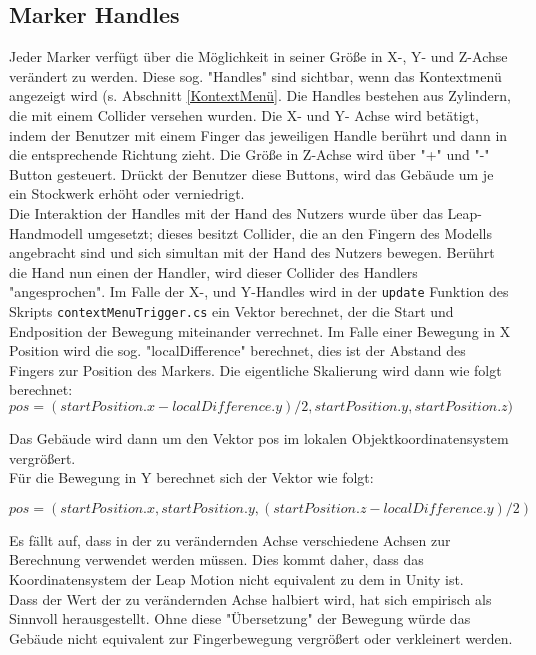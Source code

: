 \subsection{Marker Handles}\label{sec:markerHandles}
Jeder Marker verfügt über die Möglichkeit in seiner Größe in X-, Y- und Z-Achse verändert zu werden. Diese sog. "Handles" sind sichtbar, wenn das Kontextmenü angezeigt wird (s. Abschnitt  \ref{KontextMenü}. Die Handles bestehen aus Zylindern, die mit einem Collider versehen wurden. Die X- und Y- Achse wird betätigt, indem der Benutzer mit einem Finger das jeweiligen Handle berührt und dann in die entsprechende Richtung zieht. Die Größe in Z-Achse wird über "+" und "-" Button gesteuert. Drückt der Benutzer diese Buttons, wird das Gebäude um je ein Stockwerk erhöht oder verniedrigt. \\
Die Interaktion der Handles mit der Hand des Nutzers wurde über das Leap-Handmodell umgesetzt; dieses besitzt Collider, die an den Fingern des Modells angebracht sind und sich simultan mit der Hand des Nutzers bewegen. Berührt die Hand nun einen der Handler, wird dieser Collider des Handlers "angesprochen". Im Falle der X-, und Y-Handles wird in der \texttt{update} Funktion des Skripts \texttt{contextMenuTrigger.cs} ein Vektor berechnet, der die Start und Endposition der Bewegung miteinander verrechnet. Im Falle einer Bewegung in X Position wird die sog. "localDifference" berechnet, dies ist der Abstand des Fingers zur Position des Markers. Die eigentliche Skalierung wird dann wie folgt berechnet:\\
\begin{equation}
pos = (startPosition.x - localDifference.y) / 2, startPosition.y, startPosition.z)
\end{equation}

Das Gebäude wird dann um den Vektor pos im lokalen Objektkoordinatensystem vergrößert.\\
Für die Bewegung in Y berechnet sich der Vektor wie folgt:

\begin{equation}
pos = (startPosition.x , startPosition.y, (startPosition.z - localDifference.y) / 2)
\end{equation}

Es fällt auf, dass in der zu verändernden Achse verschiedene Achsen zur Berechnung verwendet werden müssen. Dies kommt daher, dass das Koordinatensystem der Leap Motion nicht equivalent zu dem in Unity ist.\\
Dass der Wert der zu verändernden Achse halbiert wird, hat sich empirisch als Sinnvoll herausgestellt. Ohne diese "Übersetzung" der Bewegung würde das Gebäude nicht equivalent zur Fingerbewegung vergrößert oder verkleinert werden. 

